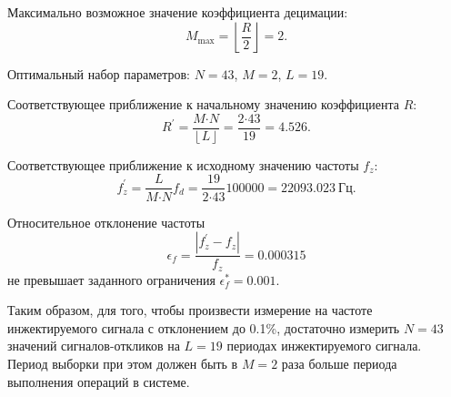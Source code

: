 Максимально возможное значение коэффициента децимации:
\begin{equation*}
    M_\text{max} = \left\lfloor \frac{R}{2} \right\rfloor = 2.
\end{equation*}

Оптимальный набор параметров: ${N=43}$, ${M=2}$, ${L=19}$.

Соответствующее приближение к начальному значению коэффициента ${R}$:
\begin{equation*}
    R^{'} = \frac{M \mathord{\cdot} N}{\left\lfloor L \right\rfloor} = \frac{2 \mathord{\cdot} 43}{19} = \num{4.526}.
\end{equation*}

Соответствующее приближение к исходному значению частоты ${f_{z}}$:
\begin{equation*}
    f^{'}_{z} = \frac{L}{M \mathord{\cdot} N}f_d = \frac{19}{2 \mathord{\cdot} 43} \num{100000} = \num{22093.023}~\text{Гц}.
\end{equation*}

Относительное отклонение частоты
\begin{equation*}
    \epsilon_{f} = \frac{\left| f^{'}_{z} - f_{z} \right|}{f_{z}} = \num{0.000315}
\end{equation*}
не превышает заданного ограничения ${\epsilon^{*}_{f}=\num{0.001}}$.

Таким образом, для того, чтобы произвести измерение на частоте инжектируемого сигнала с отклонением до \num{0.1}\%, достаточно измерить ${N=43}$ значений сигналов-откликов на ${L=19}$ периодах инжектируемого сигнала. Период выборки при этом должен быть в ${M=2}$ раза больше периода выполнения операций в системе.